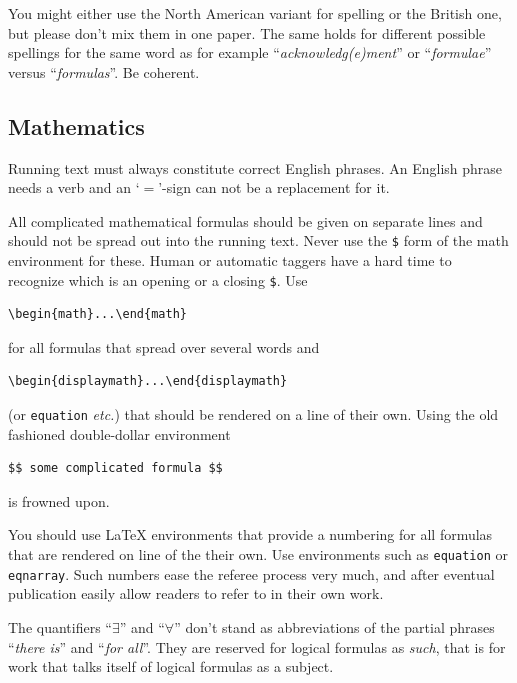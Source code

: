 \documentclass[
submission
]{dmtcs-episciences}
\begin{document}
You might either use the North American variant for spelling or the
British one, but please don't mix them in one paper. The same holds
for different possible spellings for the same word as for example
``\emph{acknowledg(e)ment}'' or ``\emph{formulae}'' versus
``\emph{formulas}''. Be coherent.

\subsection{Mathematics}
\label{sec:math}
Running text must always constitute correct English phrases.  An
English phrase needs a verb and an `$=$'-sign can not be a replacement
for it.
  
All complicated mathematical formulas should be given on separate
lines and should not be spread out into the running text.  Never use
the \verb!$! form of the math environment for these. Human or automatic
taggers have a hard time to recognize which is an opening or a closing
\verb!$!. Use
\begin{verbatim}
\begin{math}...\end{math} 
\end{verbatim}
for all formulas that spread over several words and
\begin{verbatim}
\begin{displaymath}...\end{displaymath}
\end{verbatim}
(or \texttt{equation} \textit{etc.}) that should be rendered on a line
of their own. Using the old fashioned double-dollar environment
\begin{verbatim}
$$ some complicated formula $$ 
\end{verbatim}
is frowned upon.

You should use \LaTeX{} environments that provide a numbering for all
formulas that are rendered on line of the their own. Use environments
such as \texttt{equation} or \texttt{eqnarray}. Such numbers ease the
referee process very much, and after eventual publication easily allow
readers to refer to in their own work.
  
  
The quantifiers ``$\exists$'' and ``$\forall$'' don't stand as abbreviations of
the partial phrases ``\emph{there is}'' and ``\emph{for all}''. They
are reserved for logical formulas as \emph{such}, that is for work
that talks itself of logical formulas as a subject.
  
\end{document}
